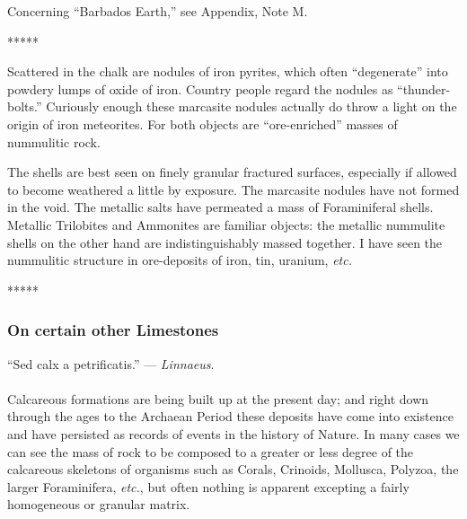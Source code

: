 \documentclass[a4paper, 12pt, oneside]{article}
\begin{document}
Concerning ``Barbados Earth,'' see Appendix, Note M.

\centerline{*\hspace{15mm}*\hspace{15mm}*\hspace{15mm}*\hspace{15mm}*}
\bigskip

Scattered in the chalk are nodules of iron pyrites, which often ``degenerate'' into powdery lumps of oxide of iron. Country people regard the nodules as ``thunder-bolts.'' Curiously enough these marcasite nodules actually do throw a light on the origin of iron meteorites. For both objects are ``ore-enriched'' masses of nummulitic rock.

The shells are best seen on finely granular fractured surfaces, especially if allowed to become weathered a little by exposure. The marcasite nodules have not formed in the void. The metallic salts have permeated a mass of Foraminiferal shells. Metallic Trilobites and Ammonites are familiar objects: the metallic nummulite shells on the other hand are indistinguishably massed together. I have seen the nummulitic structure in ore-deposits of iron, tin, uranium, \emph{etc.}

\centerline{*\hspace{15mm}*\hspace{15mm}*\hspace{15mm}*\hspace{15mm}*}
\bigskip

\subsubsection{On certain other Limestones}
\begin{displayquote}
``Sed calx a petrificatis.'' --- \emph{Linnaeus}.
\end{displayquote}
\paragraph{}
Calcareous formations are being built up at the present day; and right down through the ages to the Archaean Period these deposits have come into existence and have persisted as records of events in the history of Nature. In many cases we can see the mass of rock to be composed to a greater or less degree of the calcareous skeletons of organisms such as Corals, Crinoids, Mollusca, Polyzoa, the larger Foraminifera, \emph{etc.}, but often nothing is apparent excepting a fairly homogeneous or granular matrix.
\end{document}
